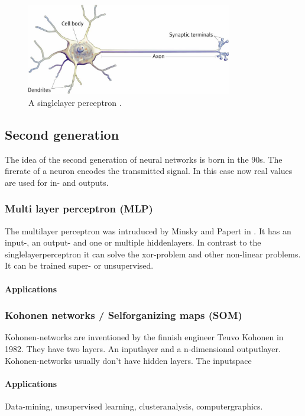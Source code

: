 \documentclass[10pt,a4paper,DIV=11]{scrreprt}
\begin{document}
\begin{center}
	\begin{figure}[H]
		\centering
		\includegraphics[width=0.8\textwidth,scale=1]{files/neuron.jpg}  
		\caption{A singlelayer perceptron \cite{PERSIN}.}
		\label{fig:neuron}
	\end{figure}
\end{center}

\subsection{Second generation}
The idea of the second generation of neural networks is born in the 90s. The firerate of a neuron encodes the transmitted signal. In this case now real values are used for in- and outputs.

\subsubsection{Multi layer perceptron (MLP)} \label{sec:mlp}
The multilayer perceptron was intruduced by Minsky and Papert in . It has an input-, an output- and
one or multiple hiddenlayers. In contrast to the singlelayerperceptron it can solve the xor-problem and other non-linear problems. It can be trained super- or unsupervised.

\paragraph{Applications}


\subsubsection{Kohonen networks / Selforganizing maps (SOM)}
Kohonen-networks are inventioned by the finnish engineer Teuvo Kohonen in 1982. They have two layers. An inputlayer and a n-dimensional outputlayer.
Kohonen-networks usually don't have hidden layers.
The inputspace 

\paragraph{Applications}
Data-mining, unsupervised learning, clusteranalysis, computergraphics. 
\end{document}
